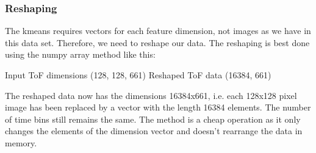 \documentclass[letterpaper,10pt,english]{sphinxmanual}
\begin{document}
\begin{sphinxVerbatim}[commandchars=\\\{\}]
   
  
\end{sphinxVerbatim}

\noindent{}


\subsubsection{Reshaping}
\label{\detokenize{ML4NeutronImageSegmentation:reshaping}}
The k\sphinxhyphen{}means requires vectors for each feature dimension, not images as we have in this data set. Therefore, we need to reshape our data. The reshaping is best done using the numpy array method  like this:

\begin{sphinxVerbatim}[commandchars=\\\{\}]
\PYG{p}{[}\PYG{p}{[}\PYG{p}{]}\PYG{p}{[}\PYG{p}{]}\PYG{p}{[}\PYG{p}{]}\PYG{p}{]}
\end{sphinxVerbatim}

\begin{sphinxVerbatim}[commandchars=\\\{\}]
Input ToF dimensions (128, 128, 661)
Reshaped ToF data (16384, 661)
\end{sphinxVerbatim}

The reshaped data  now has the dimensions 16384x661, i.e. each 128x128 pixel image has been replaced by a vector with the length 16384 elements. The number of time bins still remains the same. The method is a cheap operation as it only changes the elements of the dimension vector and doesn’t rearrange the data in memory.
\end{document}
